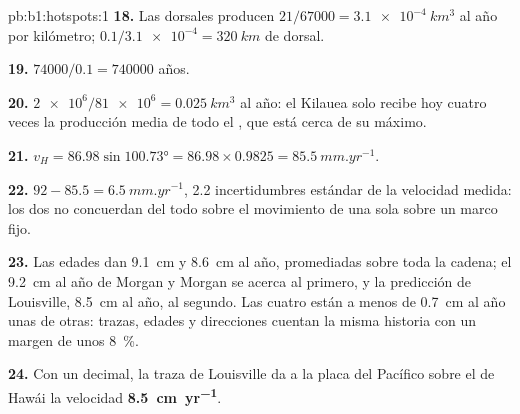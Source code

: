 \begin{solution}{pb:b1:hotspots:1}
\textbf{18.} Las dorsales producen $21/67000 = \qty{3.1e-4}{km^3}$ al año por
kilómetro; $0.1/\num{3.1e-4} = \qty{320}{km}$ de dorsal.

\textbf{19.} $74000/0.1 = \num{740000}$ años.

\textbf{20.} $\num{2e6}/\num{81e6} = \qty{0.025}{km^3}$ al año: el Kilauea solo
recibe hoy cuatro veces la producción media de todo el , que está
cerca de su máximo.

\textbf{21.} $v_H = 86.98\sin\ang{100.73} = 86.98\times0.9825 =
\qty{85.5}{mm.yr^{-1}}$.

\textbf{22.} $92 - 85.5 = \qty{6.5}{mm.yr^{-1}}$, 2.2 incertidumbres estándar de
la velocidad medida: los dos  no concuerdan del todo sobre el movimiento de una sola  sobre un marco fijo.

\textbf{23.} Las edades dan \qty{9.1}{cm} y \qty{8.6}{cm} al año, promediadas sobre toda la cadena; el \qty{9.2}{cm} al año de Morgan y Morgan
se acerca al primero, y la predicción de Louisville, \qty{8.5}{cm} al año, al segundo. Las cuatro están a menos de \qty{0.7}{cm} al año unas de
otras: trazas, edades y direcciones cuentan la misma historia con un margen de unos \qty{8}{\percent}.

\textbf{24.} Con un decimal, la traza de Louisville da a la placa del Pacífico sobre el  de Hawái la velocidad
\textbf{\qty[text-series-to-math=true]{8.5}{cm.yr^{-1}}}.
\end{solution}
